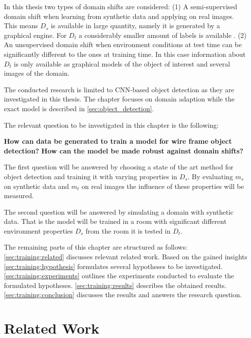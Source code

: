In this thesis two types of domain shifts are considered: (1) A semi-supervised domain shift when learning from synthetic data and applying on real images. This means $D_s$ is available in large quantity, namely it is generated by a graphical engine. For $D_t$ a considerably smaller amount of labels is available . 
(2) An unsupervised domain shift when environment conditions at test time can be significantly different to the ones at training time. In this case information about $D_t$ is only available as graphical models of the object of interest and several images of the domain. 

The conducted research is limited to \ac{CNN}-based object detection as they are investigated in this thesis. The chapter focuses on domain adaption while the exact model is described in \autoref{sec:object_detection}.

The relevant question to be investigated in this chapter is the following:

\begin{center}
	\textbf{How can data be generated to train a model for wire frame object detection?}
	\textbf{How can the model be made robust against domain shifts?}
\end{center}

The first question will be answered by choosing a state of the art method for object detection and training it with varying properties in $D_s$. By evaluating $m_s$ on synthetic data and $m_t$ on real images the influence of these properties will be measured.  

The second question will be answered by simulating a domain with synthetic data. That is the model will be trained in a room with significant different environment properties $D_s$ from the room it is tested in $D_t$.

The remaining parts of this chapter are structured as follows: \autoref{sec:training:related} discusses relevant related work. Based on the gained insights \autoref{sec:training:hypothesis} formulates several hypotheses to be investigated. \autoref{sec:training:experiments} outlines the experiments conducted to evaluate the formulated hypotheses. \autoref{sec:training:results} describes the obtained results. \autoref{sec:training:conclusion} discusses the results and answers the research question.

\section{Related Work}
\label{sec:training:related}



